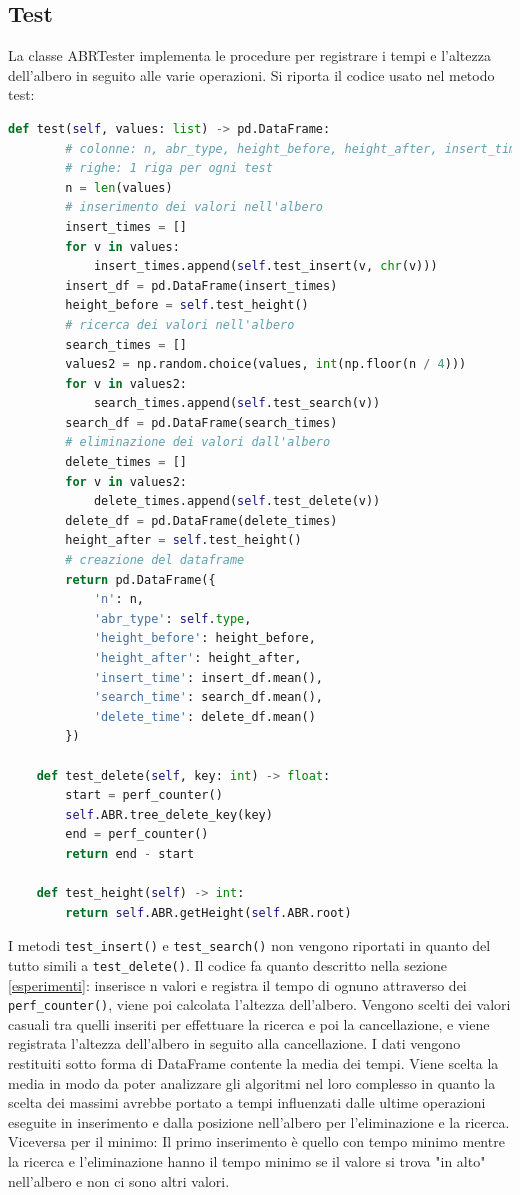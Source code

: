 \documentclass{article}
\begin{document}
\subsection{Test} \label{test}
La classe ABRTester implementa le procedure per registrare i tempi e l'altezza dell'albero in seguito alle varie operazioni.
Si riporta il codice usato nel metodo test: 
\begin{lstlisting}[language=Python, caption={Algoritmo di test}, label=eliminazioneflag]
    def test(self, values: list) -> pd.DataFrame:
        # colonne: n, abr_type, height_before, height_after, insert_time, search_time, delete_time
        # righe: 1 riga per ogni test
        n = len(values)
        # inserimento dei valori nell'albero
        insert_times = []
        for v in values:
            insert_times.append(self.test_insert(v, chr(v)))
        insert_df = pd.DataFrame(insert_times)
        height_before = self.test_height()
        # ricerca dei valori nell'albero
        search_times = []
        values2 = np.random.choice(values, int(np.floor(n / 4)))
        for v in values2:
            search_times.append(self.test_search(v))
        search_df = pd.DataFrame(search_times)
        # eliminazione dei valori dall'albero
        delete_times = []
        for v in values2:
            delete_times.append(self.test_delete(v))
        delete_df = pd.DataFrame(delete_times)
        height_after = self.test_height()
        # creazione del dataframe
        return pd.DataFrame({
            'n': n,
            'abr_type': self.type,
            'height_before': height_before,
            'height_after': height_after,
            'insert_time': insert_df.mean(),
            'search_time': search_df.mean(),
            'delete_time': delete_df.mean()
        })     

    def test_delete(self, key: int) -> float:
        start = perf_counter()
        self.ABR.tree_delete_key(key)
        end = perf_counter()
        return end - start
    
    def test_height(self) -> int:
        return self.ABR.getHeight(self.ABR.root)
\end{lstlisting}
I metodi \verb|test_insert()| e \verb|test_search()| non vengono riportati in quanto del tutto simili a \verb|test_delete()|.
Il codice fa quanto descritto nella sezione \ref{esperimenti}: inserisce n valori e registra il tempo di ognuno attraverso dei \verb|perf_counter()|, viene poi calcolata l'altezza dell'albero. Vengono scelti dei valori casuali tra quelli inseriti per effettuare la ricerca e poi la cancellazione, e viene registrata l'altezza dell'albero in seguito alla cancellazione.
I dati vengono restituiti sotto forma di DataFrame contente la media dei tempi. Viene scelta la media in modo da poter analizzare gli algoritmi nel loro complesso in quanto la scelta dei massimi avrebbe portato a tempi influenzati dalle ultime operazioni eseguite in inserimento e dalla posizione nell'albero per l'eliminazione e la ricerca. Viceversa per il minimo: Il primo inserimento è quello con tempo minimo mentre la ricerca e l'eliminazione hanno il tempo minimo se il valore si trova "in alto" nell'albero e non ci sono altri valori.
\end{document}
